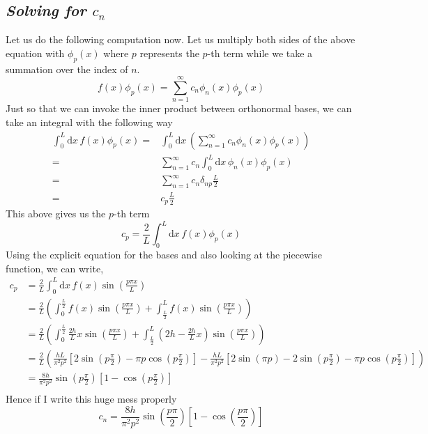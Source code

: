 \documentclass[letter]{article}
\begin{document}
\subsection*{\emph{Solving for $c_n$} }
Let us do the following computation now. Let us multiply both sides of the above equation with $\phi_p(x)$ where $p$ represents the  $p$-th term while we take a summation over the index of $n$.
\[
f(x) \phi_p (x) = \sum_{n=1}^{\infty} c_n \phi_n(x) \phi_p(x)
\]
Just so that we can invoke the inner product between orthonormal bases, we can take an integral with the following way
\begin{align*}
	\int_{0}^{L} \mathrm{d} x \,  f(x) \phi_p(x) =& \int_{0}^{L} \mathrm{d} x\,  \left(
 \sum_{n=1}^{\infty} c_n \phi_n(x) \phi_p(x) \right) \\ 
		=& \sum_{n=1}^{\infty} c_n \int_{0}^{L} \mathrm{d} x \, \phi_n(x) \phi_p(x)  \\
		=& \sum_{n=1}^{\infty} c_n \delta_{np} \frac{L}{2} \\
		=& c_p \frac{L}{2}
\end{align*}
This above gives us the $p$-th term
\[
c_p = \frac{2}{L} \int_{0}^{L} \mathrm{d} x \, f(x) \phi_p(x) 
\] 
Using the explicit equation for the bases and also looking at the piecewise function, we can write, 
\begin{align*}
	c_p &= \frac{2}{L} \int_{0}^{L} \mathrm{d} x \, f(x) \sin \left( \frac{p \pi x }{L}\right)  \\
	&= \frac{2}{L} 
	\left( \int_{0}^{\frac{L}{2}}  f(x) \sin\left(\frac{p \pi x}{L}\right) + 
	\int_{\frac{L}{2}}^{L} f(x) \sin \left(\frac{p \pi x}{L}\right)  \right)\\
	&= \frac{2}{L} 
	\left(
	\int_{0}^{\frac{L}{2} } \frac{2h}{L} x \sin\left(\frac{p \pi x}{L}\right) +
	\int_{\frac{L}{2}}^{L} \left(2 h - \frac{2h}{L} x \right) \sin \left(\frac{p \pi x}{L}\right) 
	\right)\\
	&= 
	\frac{2}{L} 
	\left(
\frac{hL}{\pi ^2 p^2 } \left[ 
2 \sin \left(p \frac{\pi}{2} \right) - \pi p \cos \left(p \frac{\pi}{2}\right)
\right]  - \frac{hL}{\pi ^2 p ^2} 
\left[
	2 \sin\left(\pi p \right) - 2 \sin \left(p \frac{\pi}{2}\right) - \pi p \cos \left(p \frac{\pi}{ 2}\right)
\right]
	\right)\\ 
	&= \frac{8h}{\pi ^2 p^2} \sin \left(p \frac{\pi}{2}\right) \left[1 - \cos \left(p \frac{\pi}{2}\right)\right] \\
\end{align*}
Hence if I write this huge mess properly
\[
\boxed{
	c_n = \frac{8h}{\pi ^2 p ^2} \sin\left(\frac{p \pi }{2}\right) \left[ 1 - \cos \left(\frac{p \pi }{2}\right) \right]
}
\] 
\end{document}
